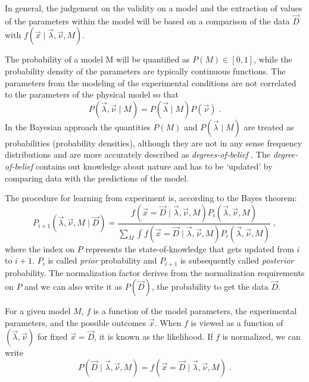 In general, the judgement on the validity on a model and the extraction of values of the parameters within the model will be based on a comparison of the data $\vec{D}$ with $f(\vec{x}\mid\vec{\lambda},\vec{\nu},M)$.

 The probability of a model M will be quantified as $P(M)\in[0,1]$, while the probability density of the parameters are typically continuous functions. The parameters from the modeling of the experimental conditions are not correlated to the parameters of the physical model so that
\begin{equation}P(\vec{\lambda},\vec{\nu}\mid M)=P(\vec{\lambda}\mid M)P(\vec{\nu})\;.\end{equation}
In the Bayesian approach the quantities $P(M)$ and $P(\vec{\lambda}\mid M)$ are treated as probabilities (probability densities), although they are not in any sense frequency distributions and are more accurately described as \emph{degrees-of-belief} \cite{bayesbook}. The \emph{degree-of-belief} contains out knowledge about nature and has to be `updated' by comparing data with the predictions of the model.

The procedure for learning from experiment is, according to the Bayes theorem:
\begin{equation}P_{i+1}(\vec{\lambda},\vec{\nu},M\mid\vec{D})=\frac{f(\vec{x}=\vec{D}\mid\vec{\lambda},\vec{\nu},M)P_i(\vec{\lambda},\vec{\nu},M)}{\sum_M\int f(\vec{x}=\vec{D}\mid\vec{\lambda},\vec{\nu},M)P_i(\vec{\lambda},\vec{\nu},M)}\;,\end{equation}
where the index on $P$ represents the state-of-knowledge that gets updated from $i$ to $i+1$. $P_i$ is called \emph{prior} probability and $P_{i+1}$ is subsequently called \emph{posterior} probability. The normalization factor derives from the normalization requirements on $P$ and we can also write it as $P(\vec{D})$, the probability to get the data $\vec{D}$.

For a given model $M$, $f$ is a function of the model parameters, the experimental parameters, and the possible outcomes $\vec{x}$. When $f$ is viewed as a function of $(\vec{\lambda},\vec{\nu})$ for fixed $\vec{x}=\vec{D}$, it is known as the likelihood. If $f$ is normalized, we can write
\begin{equation}P(\vec{D}\mid\vec{\lambda},\vec{\nu},M)=f(\vec{x}=\vec{D}\mid\vec{\lambda},\vec{\nu},M)\;.\end{equation}

